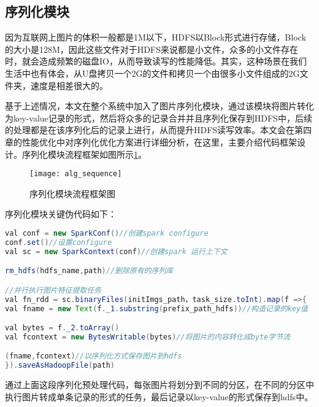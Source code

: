 \subsection{序列化模块}
因为互联网上图片的体积一般都是1M以下，HDFS以Block形式进行存储，Block的大小是128M，因此这些文件对于HDFS来说都是小文件，众多的小文件存在时，就会造成频繁的磁盘IO，从而导致读写的性能降低。其实，这种场景在我们生活中也有体会，从U盘拷贝一个2G的文件和拷贝一个由很多小文件组成的2G文件夹，速度是相差很大的。

基于上述情况，本文在整个系统中加入了图片序列化模块，通过该模块将图片转化为key-value记录的形式，然后将众多的记录合并并且序列化保存到HDFS中，后续的处理都是在该序列化后的记录上进行，从而提升HDFS读写效率。本文会在第四章的性能优化中对序列化优化方案进行详细分析，在这里，主要介绍代码框架设计。序列化模块流程框架如图所示\ref{fig:alg_sequence}。
\begin{figure}[htp]
\centering
\texttt{[image: alg\_sequence]}
\caption{序列化模块流程框架图}
\label{fig:alg_sequence}
\end{figure}

序列化模块关键伪代码如下：
\begin{lstlisting}[language=Java]
val conf = new SparkConf()//创建spark configure
conf.set()//设置configure
val sc = new SparkContext(conf)//创建spark 运行上下文

rm_hdfs(hdfs_name,path)//删除原有的序列库

//并行执行图片特征提取任务
val fn_rdd = sc.binaryFiles(initImgs_path，task_size.toInt).map(f =>{
val fname = new Text(f._1.substring(prefix_path_hdfs))//构造记录的key值

val bytes = f._2.toArray()
val fcontext = new BytesWritable(bytes)//将图片的内容转化成byte字节流

(fname,fcontext)//以序列化方式保存图片到hdfs
}).saveAsHadoopFile(path)
\end{lstlisting}

通过上面这段序列化预处理代码，每张图片将划分到不同的分区，在不同的分区中执行图片转成单条记录的形式的任务，最后记录以key-value的形式保存到hdfs中。
